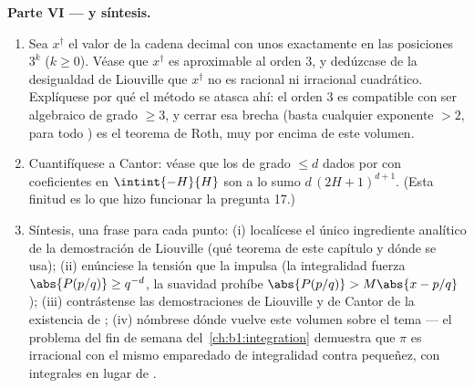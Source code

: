 \begin{problem}
\medskip
\noindent\textbf{Parte VI ---  y síntesis.}
\begin{enumerate}[resume]
  \item Sea $x^\dagger$ el valor de la cadena decimal con unos
        exactamente en las posiciones $3^k$ ($k \geq 0$). Véase que
        $x^\dagger$ es aproximable al orden $3$, y dedúzcase de la
        desigualdad de Liouville que $x^\dagger$ no es racional ni
        irracional cuadrático. Explíquese por qué el método se atasca
        ahí: el orden $3$ es compatible con ser algebraico de grado
        $\geq 3$, y cerrar esa brecha (basta cualquier exponente
        $> 2$, para todo ) es el teorema de Roth,
        muy por encima de este volumen.
  \item Cuantifíquese a Cantor: véase que los  de
        grado $\leq d$ dados por  con coeficientes en
        $\intint{-H}{H}$ son a lo sumo $d\,(2H + 1)^{d+1}$. (Esta
        finitud es lo que hizo funcionar la pregunta 17.)
  \item Síntesis, una frase para cada punto: (i) localícese el único
        ingrediente analítico de la demostración de Liouville (qué
        teorema de este capítulo y dónde se usa); (ii) enúnciese la
        tensión que la impulsa (la integralidad fuerza
        $\abs{P(p/q)} \geq q^{-d}$, la suavidad prohíbe
        $\abs{P(p/q)} > M\abs{x - p/q}$); (iii) contrástense las
        demostraciones de Liouville y de Cantor de la existencia de
        ; (iv) nómbrese dónde vuelve este
        volumen sobre el tema --- el problema del fin de semana
        del~\cref{ch:b1:integration} demuestra que $\pi$ es irracional
        con el mismo emparedado de integralidad contra pequeñez, con
        integrales en lugar de .
\end{enumerate}
\end{problem}
